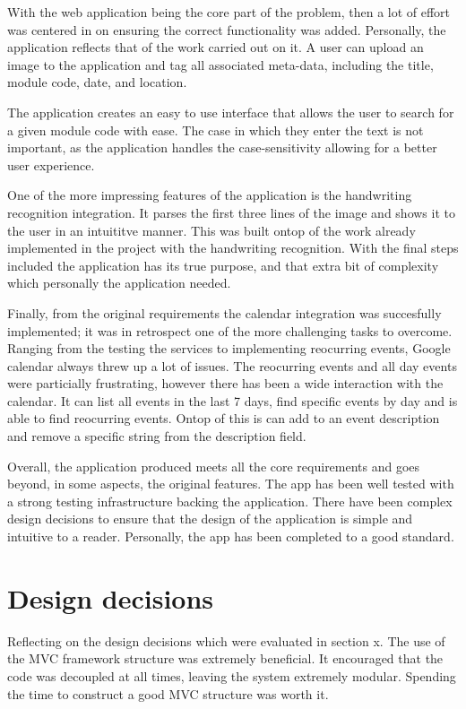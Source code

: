 With the web application being the core part of the problem, then a lot of effort was centered in on ensuring the correct functionality was added. Personally, the application reflects that of the work carried out on it. A user can upload an image to the application and tag all associated meta-data, including the title, module code, date, and location.

The application creates an easy to use interface that allows the user to search for a given module code with ease. The case in which they enter the text is not important, as the application handles the case-sensitivity allowing for a better user experience.

One of the more impressing features of the application is the handwriting recognition integration. It parses the first three lines of the image and shows it to the user in an intuititve manner. This was built ontop of the work already implemented in the project with the handwriting recognition. With the final steps included the application has its true purpose, and that extra bit of complexity which personally the application needed.

Finally, from the original requirements the calendar integration was succesfully implemented; it was in retrospect one of the more challenging tasks to overcome. Ranging from the testing the services to implementing reocurring events, Google calendar always threw up a lot of issues. The reocurring events and all day events were particially frustrating, however there has been a wide interaction with the calendar. It can list all events in the last 7 days, find specific events by day and is able to find reocurring events. Ontop of this is can add to an event description and remove a specific string from the description field.

Overall, the application produced meets all the core requirements and goes beyond, in some aspects, the original features. The app has been well tested with a strong testing infrastructure backing the application. There have been complex design decisions to ensure that the design of the application is simple and intuitive to a reader. Personally, the app has been completed to a good standard.

\section{Design decisions}
Reflecting on the design decisions which were evaluated in section x. The use of the MVC framework structure was extremely beneficial. It encouraged that the code was decoupled at all times, leaving the system extremely modular. Spending the time to construct a good MVC structure was worth it.

